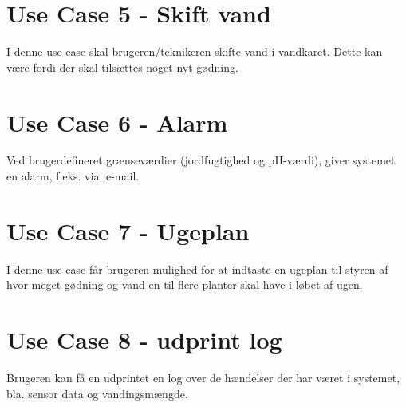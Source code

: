\section{Use Case 5 - Skift vand}
I denne use case skal brugeren/teknikeren skifte vand i vandkaret. Dette kan være fordi der skal tilsættes noget nyt gødning.

\section{Use Case 6 - Alarm}
Ved brugerdefineret grænseværdier (jordfugtighed og pH-værdi), giver systemet en alarm, f.eks. via. e-mail. 

\section{Use Case 7 - Ugeplan}
I denne use case får brugeren mulighed for at indtaste en ugeplan til styren af hvor meget gødning og vand en til flere planter skal have i løbet af ugen. 

\section{Use Case 8 - udprint log}
Brugeren kan få en udprintet en log over de hændelser der har været i systemet, bla. sensor data og vandingsmængde.